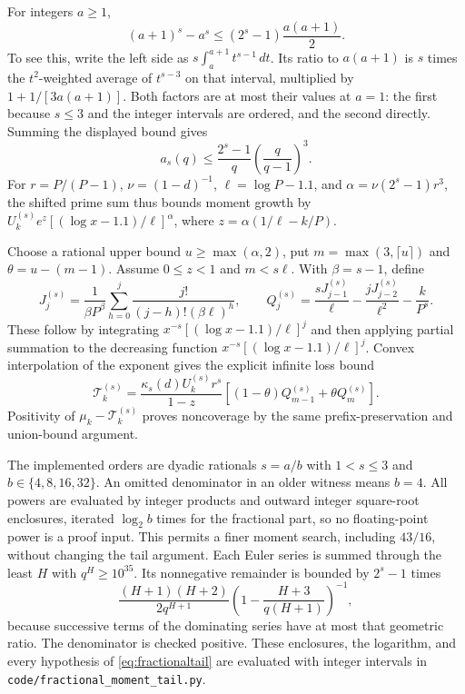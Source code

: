 \documentclass[11pt]{article}
\begin{document}
For integers $a\geq1$,
\[
 (a+1)^s-a^s\leq(2^s-1)\frac{a(a+1)}2.
\]
To see this, write the left side as
$s\int_a^{a+1}t^{s-1}\,dt$. Its ratio to $a(a+1)$ is $s$ times
the $t^2$-weighted average of $t^{s-3}$ on that interval, multiplied by
$1+1/[3a(a+1)]$. Both factors are at most their values at $a=1$:
the first because $s\leq3$ and the integer intervals are ordered, and the
second directly. Summing the displayed bound gives
\[
 a_s(q)\leq\frac{2^s-1}{q}\left(\frac q{q-1}\right)^3.
\]
For $r=P/(P-1)$, $\nu=(1-d)^{-1}$, $\ell=\log P-1.1$, and
$\alpha=\nu(2^s-1)r^3$, the shifted prime sum thus bounds moment growth
by $U_k^{(s)}e^z[(\log x-1.1)/\ell]^\alpha$, where
$z=\alpha(1/\ell-k/P)$.

Choose a rational upper bound $u\geq\max(\alpha,2)$, put
$m=\max(3,\lceil u\rceil)$ and
$\theta=u-(m-1)$. Assume $0\leq z<1$ and $m<s\ell$.
With $\beta=s-1$, define
\[
 J_j^{(s)}=\frac1{\beta P^\beta}
       \sum_{h=0}^j\frac{j!}{(j-h)!(\beta\ell)^h},\qquad
 Q_j^{(s)}=\frac{sJ_{j-1}^{(s)}}\ell
       -\frac{jJ_{j-2}^{(s)}}{\ell^2}-\frac{k}{P^s}.
\]
These follow by integrating $x^{-s}[(\log x-1.1)/\ell]^j$ and then
applying partial summation to the decreasing function
$x^{-s}[(\log x-1.1)/\ell]^j$. Convex interpolation of the exponent gives
the explicit infinite loss bound
\begin{equation}\label{eq:fractionaltail}
 \mathcal T_k^{(s)}=
 \frac{\kappa_s(d)U_k^{(s)}r^s}{1-z}
 \left[(1-\theta)Q_{m-1}^{(s)}+\theta Q_m^{(s)}\right].
\end{equation}
Positivity of $\mu_k-\mathcal T_k^{(s)}$ proves noncoverage by the same
prefix-preservation and union-bound argument.

The implemented orders are dyadic rationals $s=a/b$ with $1<s\leq3$
and $b\in\{4,8,16,32\}$. An omitted denominator in an older witness means
$b=4$. All powers are evaluated by integer products and outward integer
square-root enclosures, iterated $\log_2 b$ times for the fractional part,
so no floating-point power is a proof input. This permits a finer moment
search, including $43/16$, without changing the tail argument. Each Euler
series is summed through the least $H$ with $q^H\geq10^{35}$.
Its nonnegative remainder is bounded by $2^s-1$ times
\[
 \frac{(H+1)(H+2)}{2q^{H+1}}
 \left(1-\frac{H+3}{q(H+1)}\right)^{-1},
\]
because successive terms of the dominating series have at most that
geometric ratio. The denominator is checked positive. These enclosures,
the logarithm, and every hypothesis of \eqref{eq:fractionaltail} are
evaluated with integer intervals in \texttt{code/fractional\_moment\_tail.py}.
\end{document}
